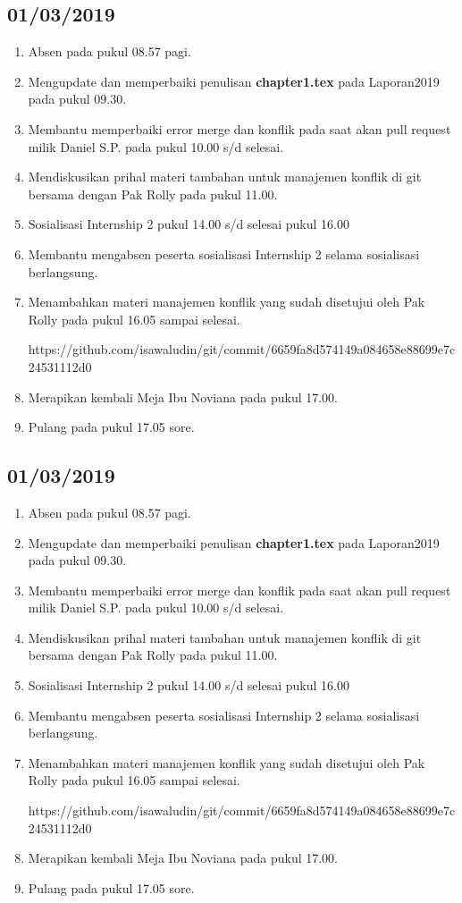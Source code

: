 \subsection{01/03/2019}
\begin{enumerate}
  \item Absen pada pukul 08.57 pagi.
  \item Mengupdate dan memperbaiki penulisan \textbf{chapter1.tex} pada Laporan2019 pada pukul 09.30.
  \item Membantu memperbaiki error merge dan konflik pada saat akan pull request milik Daniel S.P. pada pukul 10.00 s/d selesai.
  \item Mendiskusikan prihal materi tambahan untuk manajemen konflik di git bersama dengan Pak Rolly pada pukul 11.00.
  \item Sosialisasi Internship 2 pukul  14.00 s/d selesai pukul 16.00
  \item Membantu mengabsen peserta sosialisasi Internship 2 selama sosialisasi berlangsung.
  \item Menambahkan materi manajemen konflik yang sudah disetujui oleh Pak Rolly pada pukul 16.05 sampai selesai.
  \par https://github.com/isawaludin/git/commit/6659fa8d574149a084658e88699e7c24531112d0 
  \item Merapikan kembali Meja Ibu Noviana pada pukul 17.00.
  \item Pulang pada pukul 17.05 sore.

\end{enumerate}

\subsection{01/03/2019}
\begin{enumerate}
  \item Absen pada pukul 08.57 pagi.
  \item Mengupdate dan memperbaiki penulisan \textbf{chapter1.tex} pada Laporan2019 pada pukul 09.30.
  \item Membantu memperbaiki error merge dan konflik pada saat akan pull request milik Daniel S.P. pada pukul 10.00 s/d selesai.
  \item Mendiskusikan prihal materi tambahan untuk manajemen konflik di git bersama dengan Pak Rolly pada pukul 11.00.
  \item Sosialisasi Internship 2 pukul  14.00 s/d selesai pukul 16.00
  \item Membantu mengabsen peserta sosialisasi Internship 2 selama sosialisasi berlangsung.
  \item Menambahkan materi manajemen konflik yang sudah disetujui oleh Pak Rolly pada pukul 16.05 sampai selesai.
  \par https://github.com/isawaludin/git/commit/6659fa8d574149a084658e88699e7c24531112d0
  \item Merapikan kembali Meja Ibu Noviana pada pukul 17.00.
  \item Pulang pada pukul 17.05 sore.
\end{enumerate}

